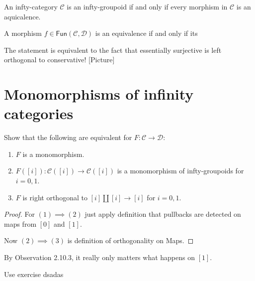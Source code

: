 \begin{lemma}
\label{lemma-group-iff-every-morph-equiv}
An infty-category $\mathcal{C}$ is an
infty-groupoid if
and only if every morphism in $\mathcal{C}$
is an aquicalence.
\end{lemma}

\begin{lemma}
\label{lemma-}
A morphism $f \in
\mathsf{Fun}(\mathcal{C},\mathcal{D})$ is an
equivalence
if and only if its
\end{lemma}

\begin{exercise}
\label{exercise-2.18}
The statement is equivalent to the fact that
essentially surjective is left orthogonal to
conservative! [Picture]
\end{exercise}

\section{Monomorphisms of infinity
categories}
\label{section-monom-infty-categ}

\begin{exercise}
\label{exercise-2.19}
Show that the following are equivalent for
$F:\mathcal{C} \to \mathcal{D}$:
\begin{enumerate}
\item $F$ is a monomorphism.
\item $F([i]):\mathcal{C}([i]) \to
\mathcal{C}([i])$
is a monomorphism of infty-groupoids for
$i=0,1$.
\item $F$ is right orthogonal to
$[i]\amalg[i]\to[i]$ for $i=0,1$.
\end{enumerate}
\end{exercise}

\begin{proof}
For $(1) \implies (2)$ just apply definition
that pullbacks are detected on maps from
$[0]$ and $[1]$.

Now $(2) \implies (3)$ is definition of
orthogonality on Maps.
\end{proof}

\begin{remark}
\label{remark-only-on-1}
By Observation 2.10.3, it really only matters
what happens on $[1]$.
\end{remark}

\begin{exercise}
\label{exercise-2.20}
Use exercise dsadas
\end{exercise}

